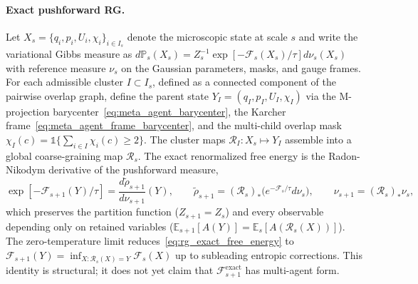 \documentclass[11pt]{article}
\begin{document}
\paragraph{Exact pushforward RG.}
Let $X_s = \{q_i, p_i, U_i, \chi_i\}_{i \in I_s}$ denote the microscopic state at scale $s$ and write the variational Gibbs measure as $d\mathbb{P}_s(X_s) = Z_s^{-1} \exp[-\mathcal{F}_s(X_s)/\tau] d\nu_s(X_s)$ with reference measure $\nu_s$ on the Gaussian parameters, masks, and gauge frames. For each admissible cluster $I \subset I_s$, defined as a connected component of the pairwise overlap graph, define the parent state $Y_I = (q_I, p_I, U_I, \chi_I)$ via the M-projection barycenter~\eqref{eq:meta_agent_barycenter}, the Karcher frame~\eqref{eq:meta_agent_frame_barycenter}, and the multi-child overlap mask $\chi_I(c) = \mathbb{1}\{\sum_{i \in I}\chi_i(c) \ge 2\}$. The cluster maps $\mathcal{R}_I : X_s \mapsto Y_I$ assemble into a global coarse-graining map $\mathcal{R}_s$. The exact renormalized free energy is the Radon-Nikodym derivative of the pushforward measure,
\begin{equation}
\exp[-\mathcal{F}_{s+1}(Y)/\tau] = \frac{d\widetilde{\rho}_{s+1}}{d\nu_{s+1}}(Y), \qquad \widetilde{\rho}_{s+1} = (\mathcal{R}_s)_*\big(e^{-\mathcal{F}_s/\tau} d\nu_s\big), \qquad \nu_{s+1} = (\mathcal{R}_s)_*\nu_s,
\label{eq:rg_exact_free_energy}
\end{equation}
which preserves the partition function ($Z_{s+1} = Z_s$) and every observable depending only on retained variables ($\mathbb{E}_{s+1}[A(Y)] = \mathbb{E}_s[A(\mathcal{R}_s(X))]$). The zero-temperature limit reduces~\eqref{eq:rg_exact_free_energy} to $\mathcal{F}_{s+1}(Y) = \inf_{X : \mathcal{R}_s(X) = Y} \mathcal{F}_s(X)$ up to subleading entropic corrections. This identity is structural; it does not yet claim that $\mathcal{F}^{\mathrm{exact}}_{s+1}$ has multi-agent form.
\end{document}
